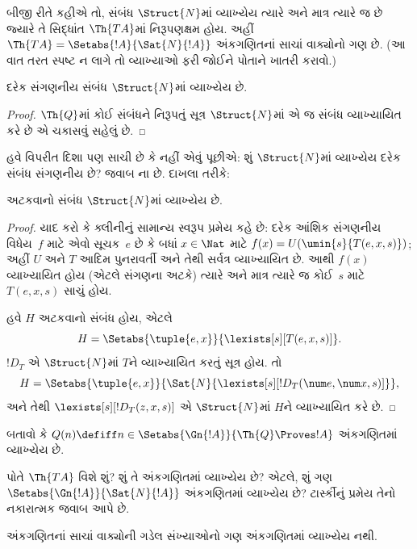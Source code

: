 બીજી રીતે કહીએ તો, સંબંધ $\Struct{N}$માં વ્યાખ્યેય ત્યારે અને માત્ર ત્યારે જ છે જ્યારે તે સિદ્ધાંત $\Th{TA}$માં નિરૂપણક્ષમ હોય. અહીં $\Th{TA} = \Setabs{!A}{\Sat{N}{!A}}$ અંકગણિતનાં સાચાં વાક્યોનો ગણ છે. (આ વાત તરત સ્પષ્ટ ન લાગે તો વ્યાખ્યાઓ ફરી જોઈને પોતાને ખાતરી કરાવો.)

\begin{lem}
દરેક સંગણનીય સંબંધ $\Struct{N}$માં વ્યાખ્યેય છે.
\end{lem}

\begin{proof}
$\Th{Q}$માં કોઈ સંબંધને નિરૂપતું સૂત્ર $\Struct{N}$માં એ જ સંબંધ વ્યાખ્યાયિત કરે છે એ ચકાસવું સહેલું છે.
\end{proof}

હવે વિપરીત દિશા પણ સાચી છે કે નહીં એવું પૂછીએ: શું $\Struct{N}$માં વ્યાખ્યેય દરેક સંબંધ સંગણનીય છે? જવાબ ના છે. દાખલા તરીકે:

\begin{lem}
અટકવાનો સંબંધ $\Struct{N}$માં વ્યાખ્યેય છે.
\end{lem}

\begin{proof}
યાદ કરો કે ક્લીનીનું સામાન્ય સ્વરૂપ પ્રમેય કહે છે: દરેક આંશિક સંગણનીય વિધેય~$f$ માટે એવો સૂચક~$e$ છે કે બધાં $x \in \Nat$ માટે $f(x) = U(\umin{s}{T(e,x,s)})$; અહીં $U$ અને $T$ આદિમ પુનરાવર્તી અને તેથી સર્વત્ર વ્યાખ્યાયિત છે. આથી $f(x)$ વ્યાખ્યાયિત હોય (એટલે સંગણના અટકે) ત્યારે અને માત્ર ત્યારે જ કોઈ~$s$ માટે $T(e,x,s)$ સાચું હોય.

હવે $H$ અટકવાનો સંબંધ હોય, એટલે
\[
H = \Setabs{\tuple{e,x}}{\lexists[s][T(e, x, s)]}.
\]
$!D_T$ એ $\Struct{N}$માં $T$ને વ્યાખ્યાયિત કરતું સૂત્ર હોય. તો
\[
H = \Setabs{\tuple{e,x}}{\Sat{N}{\lexists[s][!D_T(\num e, \num x, s)]}},
\]
અને તેથી $\lexists[s][!D_T(z, x, s)]$ એ $\Struct{N}$માં $H$ને વ્યાખ્યાયિત કરે છે.
\end{proof}

\begin{prob}
બતાવો કે $Q(n) \defiff n \in \Setabs{\Gn{!A}}{\Th{Q} \Proves !A}$ અંકગણિતમાં વ્યાખ્યેય છે.
\end{prob}

પોતે $\Th{TA}$ વિશે શું? શું તે અંકગણિતમાં વ્યાખ્યેય છે? એટલે, શું ગણ $\Setabs{\Gn{!A}}{\Sat{N}{!A}}$ અંકગણિતમાં વ્યાખ્યેય છે? ટાર્સ્કીનું પ્રમેય તેનો નકારાત્મક જવાબ આપે છે.

\begin{thm}
અંકગણિતનાં સાચાં વાક્યોની ગડેલ સંખ્યાઓનો ગણ અંકગણિતમાં વ્યાખ્યેય નથી.
\end{thm}

